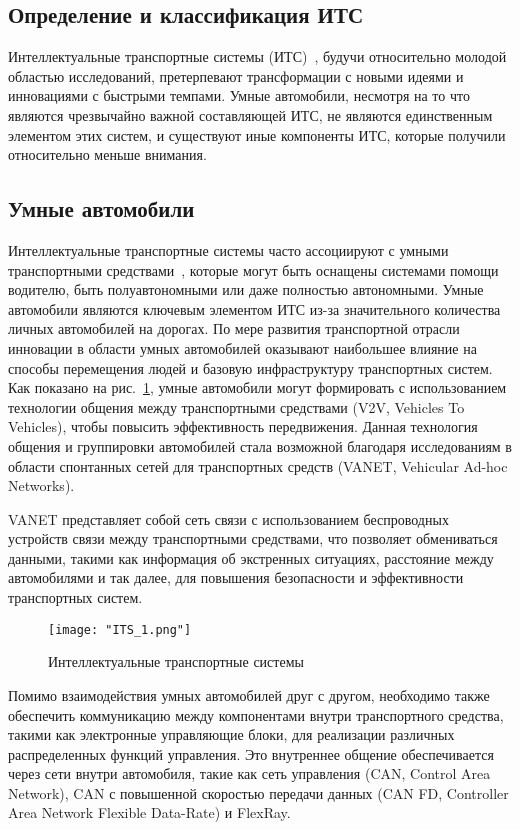 \subsection{Определение и классификация ИТС}

Интеллектуальные транспортные системы (ИТС)~\cite{qureshi2013survey}, будучи относительно молодой областью исследований, претерпевают трансформации с новыми идеями и инновациями с быстрыми темпами. Умные автомобили, несмотря на то что являются чрезвычайно важной составляющей ИТС, не являются единственным элементом этих систем, и существуют иные компоненты ИТС, которые получили относительно меньше внимания.

\subsection{Умные автомобили}

Интеллектуальные транспортные системы часто ассоциируют с умными транспортными средствами~\cite{i2018vehicular}, которые могут быть оснащены системами помощи водителю, быть полуавтономными или даже полностью автономными. Умные автомобили являются ключевым элементом ИТС из-за значительного количества личных автомобилей на дорогах. По мере развития транспортной отрасли инновации в области умных автомобилей оказывают наибольшее влияние на способы перемещения людей и базовую инфраструктуру транспортных систем. Как показано на рис.~\ref{fig:its}, умные автомобили могут формировать  с использованием технологии общения между транспортными средствами (V2V, Vehicles To Vehicles), чтобы повысить эффективность передвижения. Данная технология общения и группировки автомобилей стала возможной благодаря исследованиям в области спонтанных сетей для транспортных средств (VANET, Vehicular Ad-hoc Networks). 

VANET представляет собой сеть связи с использованием беспроводных устройств связи между транспортными средствами, что позволяет обмениваться данными, такими как информация об экстренных ситуациях, расстояние между автомобилями и так далее, для повышения безопасности и эффективности транспортных систем.

\begin{figure}[!h]
    \centering
    \texttt{[image: "ITS\_1.png"]}
    \caption{Интеллектуальные транспортные системы}
    \label{fig:its}
\end{figure}

Помимо взаимодействия умных автомобилей друг с другом, необходимо также обеспечить коммуникацию между компонентами внутри транспортного средства, такими как электронные управляющие блоки, для реализации различных распределенных функций управления. Это внутреннее общение обеспечивается через сети внутри автомобиля, такие как сеть управления (CAN, Control Area Network), CAN с повышенной скоростью передачи данных (CAN FD, Controller Area Network Flexible Data-Rate) и FlexRay.


